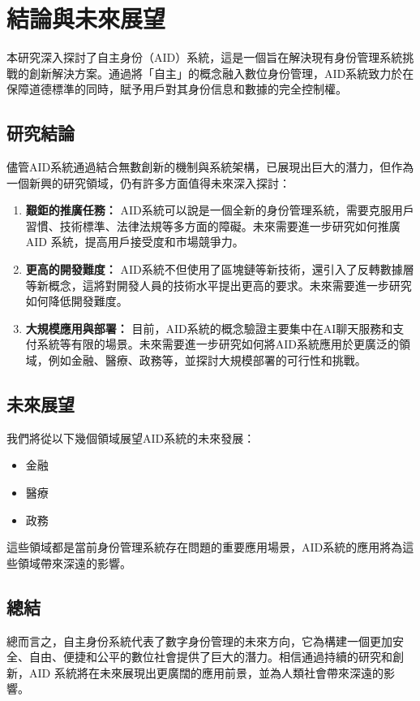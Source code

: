 
\chapter{結論與未來展望}
本研究深入探討了自主身份（AID）系統，這是一個旨在解決現有身份管理系統挑戰的創新解決方案。通過將「自主」的概念融入數位身份管理，AID系統致力於在保障道德標準的同時，賦予用戶對其身份信息和數據的完全控制權。
\section{研究結論}
儘管AID系統通過結合無數創新的機制與系統架構，已展現出巨大的潛力，但作為一個新興的研究領域，仍有許多方面值得未來深入探討：
\begin{enumerate}
    \item \textbf{艱鉅的推廣任務：} AID系統可以說是一個全新的身份管理系統，需要克服用戶習慣、技術標準、法律法規等多方面的障礙。未來需要進一步研究如何推廣 AID 系統，提高用戶接受度和市場競爭力。
    \item \textbf{更高的開發難度：} AID系統不但使用了區塊鏈等新技術，還引入了反轉數據層等新概念，這將對開發人員的技術水平提出更高的要求。未來需要進一步研究如何降低開發難度。
    \item \textbf{大規模應用與部署：} 目前，AID系統的概念驗證主要集中在AI聊天服務和支付系統等有限的場景。未來需要進一步研究如何將AID系統應用於更廣泛的領域，例如金融、醫療、政務等，並探討大規模部署的可行性和挑戰。
\end{enumerate}
\section{未來展望}
我們將從以下幾個領域展望AID系統的未來發展：
\begin{itemize}
    \item 金融
    \item 醫療
    \item 政務
\end{itemize}
這些領域都是當前身份管理系統存在問題的重要應用場景，AID系統的應用將為這些領域帶來深遠的影響。
\section{總結}
總而言之，自主身份系統代表了數字身份管理的未來方向，它為構建一個更加安全、自由、便捷和公平的數位社會提供了巨大的潛力。相信通過持續的研究和創新，AID 系統將在未來展現出更廣闊的應用前景，並為人類社會帶來深遠的影響。
